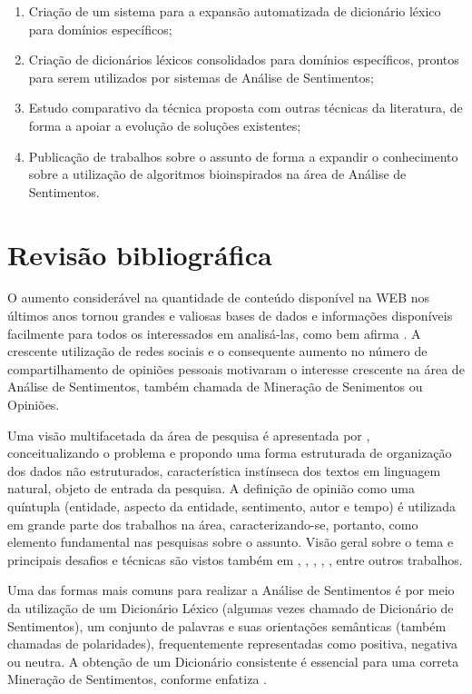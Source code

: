 \documentclass[a4paper,11pt]{article}
\begin{document}
\begin{enumerate}
\item Criação de um sistema para a expansão automatizada de dicionário léxico para domínios específicos;
\item Criação de dicionários léxicos consolidados para domínios específicos, prontos para serem utilizados por sistemas de Análise de Sentimentos;
\item Estudo comparativo da técnica proposta com outras técnicas da literatura, de forma a apoiar a evolução de soluções existentes;
\item Publicação de trabalhos sobre o assunto de forma a expandir o conhecimento sobre a utilização de algoritmos bioinspirados na área de Análise de Sentimentos.

\end{enumerate}

\section{Revisão bibliográfica}
\label{sec:bibl}
O aumento considerável na quantidade de conteúdo disponível na WEB nos últimos anos tornou grandes e valiosas bases de dados e informações disponíveis facilmente para todos os interessados em analisá-las, como bem afirma \cite{kdir16}. A crescente utilização de redes sociais e o consequente aumento no número de compartilhamento de opiniões pessoais motivaram o interesse crescente na área de Análise de Sentimentos, também chamada de Mineração de Senimentos ou Opiniões. 

Uma visão multifacetada da área de pesquisa é apresentada por \cite{liu2010multifaceted}, conceitualizando o problema e propondo uma forma estruturada de organização dos dados não estruturados, característica instínseca dos textos em linguagem natural, objeto de entrada da pesquisa. A definição de opinião como uma quíntupla (entidade, aspecto da entidade, sentimento, autor e tempo) é utilizada em grande parte dos trabalhos na área, caracterizando-se, portanto, como elemento fundamental nas pesquisas sobre o assunto. Visão geral sobre o tema e principais desafios e técnicas são vistos também em \cite{mohammad2016challenges}, \cite{ghaleb2016survey}, \cite{kdir16}, \cite{taboada2011lexicon}, \cite{bandhakavi2016lexicon}, entre outros trabalhos.

Uma das formas mais comuns para realizar a Análise de Sentimentos é por meio da utilização de um Dicionário Léxico (algumas vezes chamado de Dicionário de Sentimentos), um conjunto de palavras e suas orientações semânticas (também chamadas de polaridades), frequentemente representadas como positiva, negativa ou neutra. A obtenção de um Dicionário consistente é essencial para uma correta Mineração de Sentimentos, conforme enfatiza \cite{kdir16}. 
\end{document}
